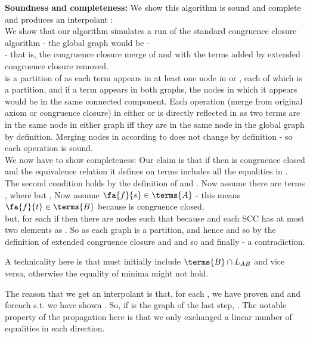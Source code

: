 \textbf{Soundness and completeness:} We show this algorithm is sound and complete and produces an interpolant :\\
We show that our algorithm simulates a run of the standard congruence closure algorithm - 
the global graph would be - \\
 - that is, the congruence closure merge of  and  
with the terms added by extended congruence closure removed.\\
 is a partition of  as each term appears in at least one node in  or , each of which is a partition, and if a term appears in both graphs, the nodes in which it appears would be in the same connected component.
Each operation (merge from original axiom or congruence closure) in either  or  is directly reflected in  as two terms are in the same node in either graph iff they are in the same node in the global graph by definition.
Merging nodes in  according to  does not change  by definition - so each operation is sound.\\
We now have to show completeness:
Our claim is that if  then  is congruence closed and the equivalence relation it defines on terms 
includes all the equalities in .\\
The second condition holds by the definition of  and .
Now assume there are terms ,  where  but , 
Now assume $\fa{f}{s} \in \terms{A}$ - this means $\fa{f}{t} \in \terms{B}$ because  is congruence closed.\\
but, for each  if  then there are nodes  such that 
 because  and each SCC has at most two elements as .
So  as each graph is a partition, 
and hence  and so by the definition of extended congruence closure
 and  and so 
 and finally  - a contradiction.

A technicality here is that  must initially include $\terms{B} \cap L_{AB}$ and vice versa, otherwise the equality of minima might not hold.

The reason that we get an interpolant is that, for each , we have proven 
and  and foreach  s.t.  we have shown 
. So, if  is the  graph of the last step, 
.
The notable property of the propagation here is that we only exchanged a linear number of equalities in each direction.
